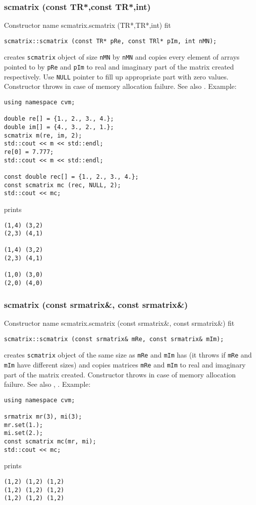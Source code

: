 \subsubsection{scmatrix (const TR*,const TR*,int)}
Constructor%
\pdfdest name {scmatrix.scmatrix (TR*,TR*,int)} fit
\begin{verbatim}
scmatrix::scmatrix (const TR* pRe, const TRl* pIm, int nMN);
\end{verbatim}
creates  \verb"scmatrix" object
of size \verb"nMN" by \verb"nMN" and copies every
element of arrays pointed to by \verb"pRe" and \verb"pIm"
to  real and imaginary part of the matrix created respectively.
Use \verb"NULL" pointer to fill up appropriate
part with zero values.
Constructor throws  
in case of memory allocation failure.
See also .
Example:
\begin{Verbatim}
using namespace cvm;

double re[] = {1., 2., 3., 4.};
double im[] = {4., 3., 2., 1.};
scmatrix m(re, im, 2);
std::cout << m << std::endl;
re[0] = 7.777;
std::cout << m << std::endl;

const double rec[] = {1., 2., 3., 4.};
const scmatrix mc (rec, NULL, 2);
std::cout << mc;
\end{Verbatim}
prints
\begin{Verbatim}
(1,4) (3,2)
(2,3) (4,1)

(1,4) (3,2)
(2,3) (4,1)

(1,0) (3,0)
(2,0) (4,0)
\end{Verbatim}
\newpage





\subsubsection{scmatrix (const srmatrix\&, const srmatrix\&)}
Constructor%
\pdfdest name {scmatrix.scmatrix (const srmatrix&, const srmatrix&)} fit
\begin{verbatim}
scmatrix::scmatrix (const srmatrix& mRe, const srmatrix& mIm);
\end{verbatim}
creates  \verb"scmatrix" object
of the same size as \verb"mRe" and \verb"mIm" has
(it throws 
if \verb"mRe" and
\verb"mIm" have different sizes)
and copies matrices \verb"mRe" and \verb"mIm"
to  real and imaginary part of the matrix created.
Constructor throws  
in case of memory allocation failure.
See also , .
Example:
\begin{Verbatim}
using namespace cvm;

srmatrix mr(3), mi(3);
mr.set(1.);
mi.set(2.);
const scmatrix mc(mr, mi);
std::cout << mc;
\end{Verbatim}
prints
\begin{Verbatim}
(1,2) (1,2) (1,2)
(1,2) (1,2) (1,2)
(1,2) (1,2) (1,2)
\end{Verbatim}
\newpage




